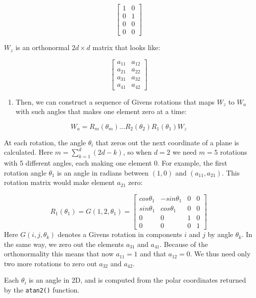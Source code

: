 \[ \begin{bmatrix}1 & 0 \\0  &1 \\ 0&0 \\0&0\end{bmatrix} \]

\(W_z\) is an orthonormal \(2d\times d\) matrix that looks like:

\[ \begin{bmatrix} a_{11} & a_{12} \\a_{21}  &a_{22} \\ a_{31}&a_{32} \\a_{41}&a_{42}\end{bmatrix} \]

\begin{enumerate}
\def\labelenumi{\arabic{enumi}.}
\setcounter{enumi}{2}
\tightlist
\item
  Then, we can construct a sequence of Givens rotations that maps \(W_z\) to \(W_a\) with such angles that makes one element zero at a time:
\end{enumerate}

\[ W_a = R_m(\theta_m) ... R_2(\theta_2)R_1(\theta_1)W_z\]

At each rotation, the angle \(\theta_i\) that zeros out the next coordinate of a plane is calculated. Here \(m = \sum_{k=1}^d (2d - k)\), so when \(d=2\) we need \(m=5\) rotations with 5 different angles, each making one element 0. For example, the first rotation angle \(\theta_1\) is an angle in radians between \((1, 0)\) and \((a_{11}, a_{21})\). This rotation matrix would make element \(a_{21}\) zero:

\[R_1(\theta_1) = G(1, 2, \theta_1) = \begin{bmatrix} cos\theta_1 & -sin\theta_1 & 0 & 0 \\sin\theta_1  &cos\theta_1 & 0 &0 \\ 0&0&1&0 \\0&0&0&1\end{bmatrix}\]
Here \(G(i,j,\theta_k)\) denotes a Givens rotation in components \(i\) and \(j\) by angle \(\theta_k\).
In the same way, we zero out the elements \(a_{31}\) and \(a_{41}\). Because of the orthonormality this means that now \(a_{11} = 1\) and that \(a_{12} = 0\). We thus need only two more rotations to zero out \(a_{32}\) and \(a_{42}\).

Each \(\theta_i\) is an angle in 2D, and is computed from the polar coordinates returned by the \texttt{atan2()} function.

